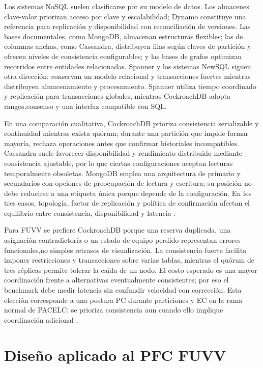 \documentclass[12pt,a4paper]{article}
\begin{document}
Los sistemas NoSQL suelen clasificarse por su modelo de datos. Los almacenes clave-valor priorizan acceso por clave y escalabilidad; Dynamo constituye una referencia para replicación y disponibilidad con reconciliación de versiones. Las bases documentales, como MongoDB, almacenan estructuras flexibles; las de columnas anchas, como Cassandra, distribuyen filas según claves de partición y ofrecen niveles de consistencia configurables; y las bases de grafos optimizan recorridos entre entidades relacionadas. Spanner y los sistemas NewSQL siguen otra dirección: conservan un modelo relacional y transacciones fuertes mientras distribuyen almacenamiento y procesamiento. Spanner utiliza tiempo coordinado y replicación para transacciones globales, mientras CockroachDB adopta rangos,consenso y una interfaz compatible con SQL\cite{decandia2007dynamo,corbett2013spanner}.

En una comparación cualitativa, CockroachDB prioriza consistencia serializable y continuidad mientras exista quórum; durante una partición que impide formar mayoría, rechaza operaciones antes que confirmar historiales incompatibles. Cassandra suele favorecer disponibilidad y rendimiento distribuido mediante consistencia ajustable, por lo que ciertas configuraciones aceptan lecturas temporalmente obsoletas. MongoDB emplea una arquitectura de primario y secundarios con opciones de preocupación de lectura y escritura; su posición no debe reducirse a una etiqueta única porque depende de la configuración. En los tres casos, topología, factor de replicación y política de confirmación afectan el equilibrio entre consistencia, disponibilidad y latencia \cite{ferreira2024consistency,taipalus2024performance}.

Para FUVV se prefiere CockroachDB porque una reserva duplicada, una asignación contradictoria o un estado de equipo perdido representan errores funcionales,no simples retrasos de visualización. La consistencia fuerte facilita imponer restricciones y transacciones sobre varias tablas, mientras el quórum de tres réplicas permite tolerar la caída de un nodo. El costo esperado es una mayor coordinación frente a alternativas eventualmente consistentes; por eso el benchmark debe medir latencia sin confundir velocidad con corrección. Esta elección corresponde a una postura PC durante particiones y EC en la rama normal de PACELC: se prioriza consistencia aun cuando ello implique coordinación adicional \cite{taft2020cockroachdb,noudoust2022quorum}.

\section{Diseño aplicado al PFC FUVV}
\label{sec:diseno-fuvv}
\end{document}
